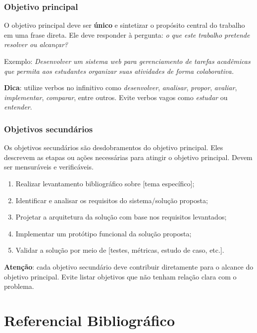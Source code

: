 \documentclass[
    12pt,                %
    openright,           %
    oneside,             %
    a4paper,             %
    english,             %
    brazil               %
]{abntex2}
\begin{document}
\subsection{Objetivo principal}

O objetivo principal deve ser \textbf{único} e sintetizar o propósito central do trabalho em uma frase direta. Ele deve responder à pergunta: \textit{o que este trabalho pretende resolver ou alcançar?}

Exemplo: \textit{Desenvolver um sistema web para gerenciamento de tarefas acadêmicas que permita aos estudantes organizar suas atividades de forma colaborativa.}

\textbf{Dica}: utilize verbos no infinitivo como \textit{desenvolver}, \textit{analisar}, \textit{propor}, \textit{avaliar}, \textit{implementar}, \textit{comparar}, entre outros. Evite verbos vagos como \textit{estudar} ou \textit{entender}.

\subsection{Objetivos secundários}

Os objetivos secundários são desdobramentos do objetivo principal. Eles descrevem as etapas ou ações necessárias para atingir o objetivo principal. Devem ser mensuráveis e verificáveis.

\begin{enumerate}
    \item Realizar levantamento bibliográfico sobre [tema específico];
    \item Identificar e analisar os requisitos do sistema/solução proposta;
    \item Projetar a arquitetura da solução com base nos requisitos levantados;
    \item Implementar um protótipo funcional da solução proposta;
    \item Validar a solução por meio de [testes, métricas, estudo de caso, etc.].
\end{enumerate}

\textbf{Atenção}: cada objetivo secundário deve contribuir diretamente para o alcance do objetivo principal. Evite listar objetivos que não tenham relação clara com o problema.

\chapter{Referencial Bibliográfico}
\label{cap:referencial}
\end{document}
